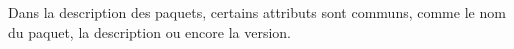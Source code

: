 \documentclass[11pt,fleqn]{book} %
\begin{document}
Dans la description des paquets, certains attributs sont communs, comme le nom du paquet, la description ou encore la version.\newline
\end{document}
